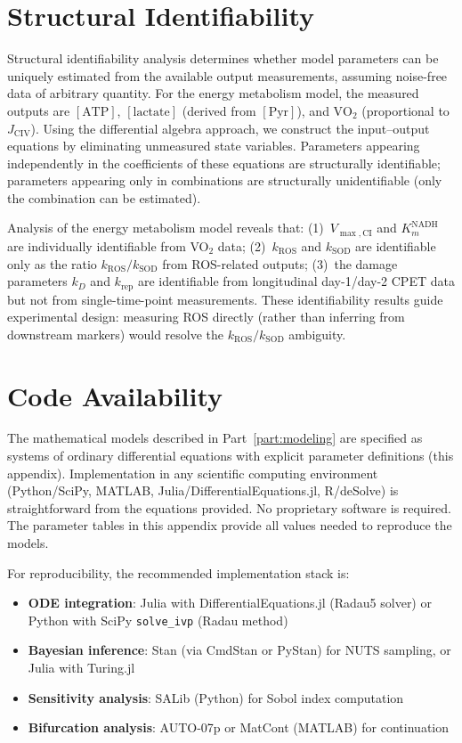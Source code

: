 \section{Structural Identifiability}
\label{sec:structural-identifiability}

Structural identifiability analysis determines whether model parameters can be uniquely estimated from the available output measurements, assuming noise-free data of arbitrary quantity. For the energy metabolism model, the measured outputs are $[\text{ATP}]$, $[\text{lactate}]$ (derived from $[\text{Pyr}]$), and $\text{VO}_2$ (proportional to $J_{\text{CIV}}$). Using the differential algebra approach, we construct the input--output equations by eliminating unmeasured state variables. Parameters appearing independently in the coefficients of these equations are structurally identifiable; parameters appearing only in combinations are structurally unidentifiable (only the combination can be estimated).

Analysis of the energy metabolism model reveals that: (1)~$V_{\max,\text{CI}}$ and $K_m^{\text{NADH}}$ are individually identifiable from VO$_2$ data; (2)~$k_{\text{ROS}}$ and $k_{\text{SOD}}$ are identifiable only as the ratio $k_{\text{ROS}}/k_{\text{SOD}}$ from ROS-related outputs; (3)~the damage parameters $k_D$ and $k_{\text{rep}}$ are identifiable from longitudinal day-1/day-2 CPET data but not from single-time-point measurements. These identifiability results guide experimental design: measuring ROS directly (rather than inferring from downstream markers) would resolve the $k_{\text{ROS}}/k_{\text{SOD}}$ ambiguity.

\section{Code Availability}
\label{sec:code-availability}

The mathematical models described in Part~\ref{part:modeling} are specified as systems of ordinary differential equations with explicit parameter definitions (this appendix). Implementation in any scientific computing environment (Python/SciPy, MATLAB, Julia/DifferentialEquations.jl, R/deSolve) is straightforward from the equations provided. No proprietary software is required. The parameter tables in this appendix provide all values needed to reproduce the models.

For reproducibility, the recommended implementation stack is:

\begin{itemize}
    \item \textbf{ODE integration}: Julia with DifferentialEquations.jl (Radau5 solver) or Python with SciPy \texttt{solve\_ivp} (Radau method)
    \item \textbf{Bayesian inference}: Stan (via CmdStan or PyStan) for NUTS sampling, or Julia with Turing.jl
    \item \textbf{Sensitivity analysis}: SALib (Python) for Sobol index computation
    \item \textbf{Bifurcation analysis}: AUTO-07p or MatCont (MATLAB) for continuation
\end{itemize}
